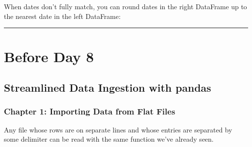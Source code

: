 \documentclass[letterpaper,10pt,english]{jupyterBook}
\begin{document}
\begin{sphinxVerbatim}[commandchars=\\\{\}]
      
             
     
    
            
\end{sphinxVerbatim}

\sphinxAtStartPar
When dates don’t fully match, you can round dates in the right DataFrame up to the nearest date in the left DataFrame:

\begin{sphinxVerbatim}[commandchars=\\\{\}]
     
\end{sphinxVerbatim}


\bigskip\hrule\bigskip



\section{Before Day 8}
\label{\detokenize{big-cheat-sheet:before-day-8}}

\subsection{Streamlined Data Ingestion with pandas}
\label{\detokenize{big-cheat-sheet:streamlined-data-ingestion-with-pandas}}

\subsubsection{Chapter 1: Importing Data from Flat Files}
\label{\detokenize{big-cheat-sheet:chapter-1-importing-data-from-flat-files}}
\sphinxAtStartPar
Any file whose rows are on separate lines and whose entries are separated by some delimiter can be read with the same  function we’ve already seen.
\end{document}

